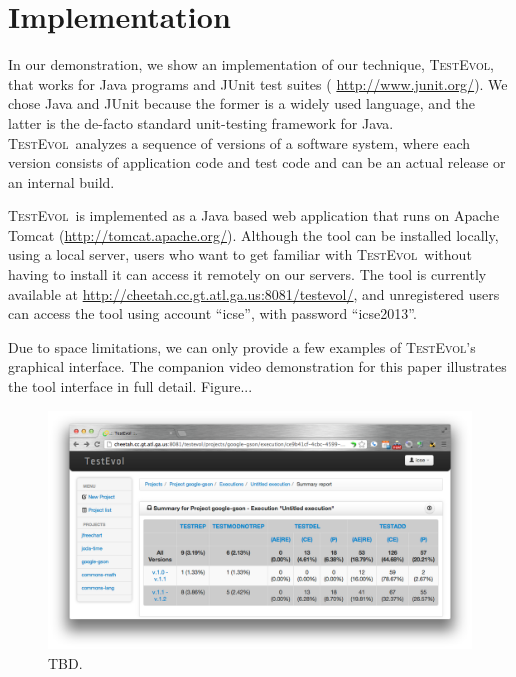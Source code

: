 \documentclass[conference]{IEEEtran}
\newcommand{\lang}[1]{\texttt{\small #1}}
\newcommand{\tool}{\textsc{TestEvol}\xspace}
\begin{document}


\section{Implementation}
\label{sec:implementation}


In our demonstration, we show an implementation of our technique,
\tool, that works for Java programs and JUnit test suites ({\small
  \url{http://www.junit.org/}}). We chose Java and JUnit because the
former is a widely used language, and the latter is the de-facto
standard unit-testing framework for Java.  \tool\ analyzes a sequence
of versions of a software system, where each version consists of
application code and test code and can be an actual release or an
internal build.

\tool\ is implemented as a Java based web application that runs on
Apache Tomcat ({\small \url{http://tomcat.apache.org/}}). Although the
tool can be installed locally, using a local server, users who want to
get familiar with \tool\ without having to install it can access it
remotely on our servers. The tool is currently available at {\small
  \url{http://cheetah.cc.gt.atl.ga.us:8081/testevol/}}, and
unregistered users can access the tool using account ``icse'', with
password ``icse2013''.

Due to space limitations, we can only provide a few examples of
\tool's graphical interface. The companion video demonstration for
this paper illustrates the tool interface in full detail. Figure...

\begin{figure}[t]
	\centering
	\includegraphics[width=\columnwidth]{1-summary}
        \vspace*{-16pt}
	\caption{TBD.}
        \vspace*{-8pt}
	\label{fig:summary}
\end{figure}
\end{document}
